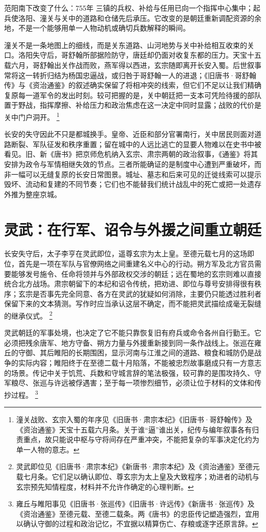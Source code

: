 \begin{turningpoint}{范阳南下改变了什么：755年}
三镇的兵权、补给与任用已向一个指挥中心集中；起兵使洛阳、潼关与关中的道路和仓储先后承压。它改变的是朝廷重新调配资源的余地，不是一个能够用单一人物动机或确切兵数解释的瞬间。
\end{turningpoint}

潼关不是一条地图上的细线，而是关东道路、山河地势与关中补给相互收束的关口。洛阳失守后，哥舒翰所部据险防守，唐廷却仍面对收复东都的压力。天宝十五载六月，哥舒翰出关作战而败，燕军得以西进，玄宗随即离开长安入蜀。后世叙事常将这一转折归结为杨国忠逼战，或归咎于哥舒翰一人的进退；《旧唐书·哥舒翰传》与《资治通鉴》的叙述确实保留了将相冲突的线索，但它们不足以让我们精确复原每一道军令的发出时刻。较可把握的是，关中朝廷把一支本可凭险待援的部队置于野战，指挥摩擦、补给压力和政治焦虑在这一决定中同时显露；战败的代价是关中门户洞开。%
\footnote{潼关战败、玄宗入蜀的年序见《旧唐书·肃宗本纪》《旧唐书·哥舒翰传》及《资治通鉴》天宝十五载六月条。关于谁“逼”谁出关，纪传与编年叙事各有归责重点，故只能说中枢与守将间存在严重冲突，不能把复杂的军事决定化约为单一人物的意志。}

长安的失守因此不只是都城换手。皇帝、近臣和部分官署南行，关中居民则面对道路断裂、军队征发和秩序重置；留在城中的人远比逃亡的显要人物难以在史书中被看见。旧、新《唐书》把京师危机纳入玄宗、肃宗两朝的政治叙事，《通鉴》将其安排为政令与军情相继失效的节点。三者所能确证的是制度中心遭到严重破坏，而非一幅可以无缝复原的长安日常图景。城址、墓志和后来可见的迁徙线索可以提示毁坏、流动和复建的不同节奏；它们也不能替我们统计战乱中的死亡或把一处遗存外推为整座京城。

\section{灵武：在行军、诏令与外援之间重立朝廷}

长安失守后，太子李亨在灵武即位，遥尊玄宗为太上皇。至德元载七月的这场即位，首先是一项在军队与官僚网络之间重建名义中心的行动。朔方军及北方官员需要能够发号施令、任命将领并与外部政权交涉的朝廷；远在蜀地的玄宗则难以直接统合北方战场。肃宗朝留下的本纪和诏令传统，把劝进、即位与尊号安排得很有秩序；玄宗是否事先完全同意、各方在灵武的犹疑如何消除，主要仍只能透过胜利者保留下来的文本猜测。写作时应当承认这层不确定，而不能把灵武描绘成毫无裂缝的继承仪式。%
\footnote{灵武即位见《旧唐书·肃宗本纪》《新唐书·肃宗本纪》及《资治通鉴》至德元载七月条。它们足以确认即位、尊玄宗为太上皇及大致程序；劝进者的动机与玄宗预先知情程度，材料并不允许作确定的心理判断。}

灵武朝廷的军事处境，也决定了它不能只靠恢复旧有府兵或命令各州自行勤王。它必须把残余唐军、地方守备、朔方力量与外援重新接到同一条作战线上。张巡在雍丘的守御、其后睢阳的长期围困，显示河南与江淮之间的道路、粮食和城防仍是战争的实际内容；睢阳终于在至德二载十月陷落，不能被忠烈故事磨成只有一方意志的场景。传记中关于饥荒、兵数和守城言辞的笔法极强，较可靠的是围攻持久、守军粮尽、张巡与许远被俘遇害；至于每一项惨烈细节，必须让位于材料的文体和传抄过程。%
\footnote{雍丘与睢阳事见《旧唐书·张巡传》《旧唐书·许远传》《新唐书·张巡传》及《资治通鉴》至德元载、至德二载条。两《唐书》的忠臣传记塑造强烈，宜用以确认守御的过程和政治记忆，不宜据以精算伤亡、存粮或逐字还原言辞。}

